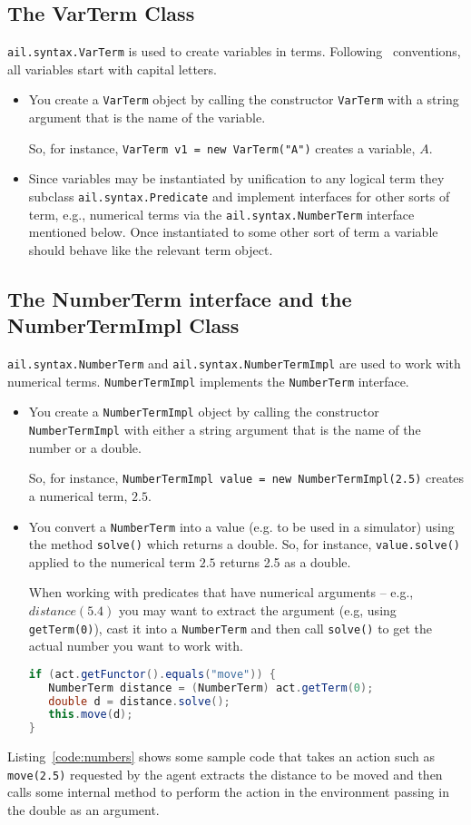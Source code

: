 \documentclass[a4]{article}
\begin{document}
\subsection{The VarTerm Class}
\texttt{ail.syntax.VarTerm} is used to create variables in terms.  Following \prolog\ conventions, all variables start with capital letters.
\begin{itemize}
\item You create a \texttt{VarTerm} object by calling the constructor \texttt{VarTerm} with a string argument that is the name of the variable.

So, for instance, \texttt{VarTerm v1 = new VarTerm("A")} creates a variable, $A$.
\item Since variables may be instantiated by unification to any logical term they subclass \texttt{ail.syntax.Predicate} and implement interfaces for other sorts of term, e.g., numerical terms via the \texttt{ail.syntax.NumberTerm} interface mentioned below.  Once instantiated to some other sort of term a variable should behave like the relevant term object.
\end{itemize}

\subsection{The NumberTerm interface and the NumberTermImpl Class}
\texttt{ail.syntax.NumberTerm} and \texttt{ail.syntax.NumberTermImpl} are used to work with numerical terms.  \texttt{NumberTermImpl} implements the \texttt{NumberTerm} interface. 
\begin{itemize}
\item You create a \texttt{NumberTermImpl} object by calling the constructor \texttt{NumberTermImpl} with either a string argument that is the name of the number or a double.

So, for instance, \texttt{NumberTermImpl value = new NumberTermImpl(2.5)} creates a numerical term, $2.5$.
\item You convert a \texttt{NumberTerm} into a value (e.g. to be used in a simulator) using the method \texttt{solve()} which returns a double.  So, for instance, \texttt{value.solve()} applied to the numerical term $2.5$ returns 2.5 as a double.

When working with predicates that have numerical arguments -- e.g., $distance(5.4)$ you may want to extract the argument (e.g, using \texttt{getTerm(0)}), cast it into a \texttt{NumberTerm} and then call \texttt{solve()} to get the actual number you want to work with.
\begin{lstlisting}[float,caption=Handling Numbers,basicstyle=\sffamily,language=Java,style=easslisting,label=code:numbers]
if (act.getFunctor().equals("move")) {
   NumberTerm distance = (NumberTerm) act.getTerm(0);
   double d = distance.solve();
   this.move(d);
}
\end{lstlisting}
\end{itemize}
Listing~\ref{code:numbers} shows some sample code that takes an action such as \texttt{move(2.5)} requested by the agent extracts the distance to be moved and then calls some internal method to perform the action in the environment passing in the double as an argument.
\end{document}
